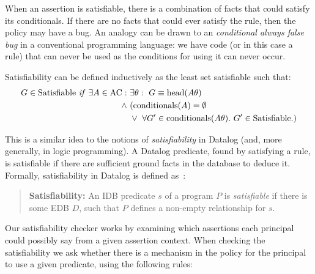\documentclass[thesis.tex]{subfiles}
\begin{document}
When an assertion is satisfiable, there is a combination of facts that
could satisfy its conditionals. If there are no facts that could ever
satisfy the rule, then the policy may have a bug. An analogy can be
drawn to an \emph{conditional always false bug} in a conventional
programming language: we have code (or in this case a rule) that can
never be used as the conditions for using it can never occur.

Satisfiability can be defined inductively as the least set satisfiable such that:
\begin{align*}
  G \in \text{Satisfiable}~\text{\textit{if}}~\exists A \in \text{AC}:~&\exists \theta:~G\equiv\text{head}(A\theta) \\
                                                              \wedge~ & (\text{conditionals}(A) = \emptyset \\
                                                                      & \vee~\forall G^\prime \in \text{conditionals}(A\theta).~G^\prime \in \text{Satisfiable}.)
\end{align*}

This is a similar idea to the notions of \emph{satisfiability} in Datalog (and,
more generally, in logic programming). A Datalog predicate, found by satisfying a
rule, is satisfiable if there are sufficient ground facts in the database to
deduce it. Formally, satisfiability in Datalog is defined
as~\cite{alon_levy_equivalence_1993}:

\begin{quote}
  \textbf{Satisfiability:} An IDB predicate $s$ of a program $P$ is
  \emph{satisfiable} if there is some EDB $D$, such that $P$ defines a
  non-empty relationship for $s$.
\end{quote}

Our satisfiability checker works by examining which assertions each principal could possibly say from a given assertion context.
When checking the satisfiability we ask whether there is a mechanism in the policy for the principal to use a given predicate, using the following rules:
\end{document}
